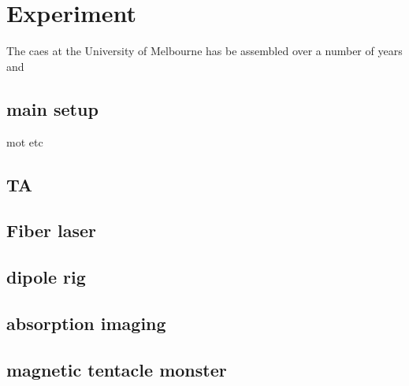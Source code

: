\chapter{Experiment}

The \gls{caes} at the University of Melbourne has be assembled over a number of years and

\section{main setup}

mot etc

\section{TA}

\section{Fiber laser}

\section{dipole rig}

\section{absorption imaging}

\section{magnetic tentacle monster}



